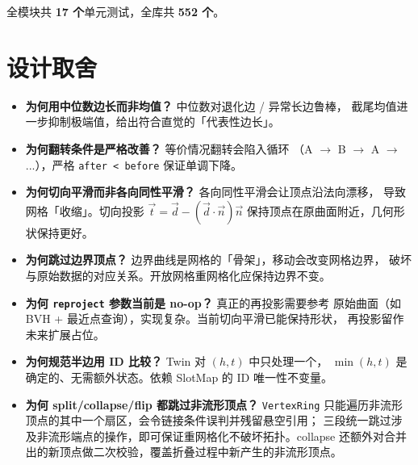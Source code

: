 \documentclass[11pt,a4paper]{article}
\begin{document}
全模块共 \textbf{17 个}单元测试，全库共 \textbf{552 个}。

\section{设计取舍}

\begin{itemize}
  \item \textbf{为何用中位数边长而非均值？} 中位数对退化边 / 异常长边鲁棒，
        截尾均值进一步抑制极端值，给出符合直觉的「代表性边长」。
  \item \textbf{为何翻转条件是严格改善？} 等价情况翻转会陷入循环
        （A $\to$ B $\to$ A $\to$ ...），严格 \texttt{after < before} 保证单调下降。
  \item \textbf{为何切向平滑而非各向同性平滑？} 各向同性平滑会让顶点沿法向漂移，
        导致网格「收缩」。切向投影 $\vec{t} = \vec{d} - (\vec{d} \cdot \vec{n})\vec{n}$
        保持顶点在原曲面附近，几何形状保持更好。
  \item \textbf{为何跳过边界顶点？} 边界曲线是网格的「骨架」，移动会改变网格边界，
        破坏与原始数据的对应关系。开放网格重网格化应保持边界不变。
  \item \textbf{为何 \texttt{reproject} 参数当前是 no-op？} 真正的再投影需要参考
        原始曲面（如 BVH + 最近点查询），实现复杂。当前切向平滑已能保持形状，
        再投影留作未来扩展占位。
  \item \textbf{为何规范半边用 ID 比较？} Twin 对 $(h, t)$ 中只处理一个，
        $\min(h, t)$ 是确定的、无需额外状态。依赖 SlotMap 的 ID 唯一性不变量。
  \item \textbf{为何 split/collapse/flip 都跳过非流形顶点？} \texttt{VertexRing}
        只能遍历非流形顶点的其中一个扇区，会令链接条件误判并残留悬空引用；
        三段统一跳过涉及非流形端点的操作，即可保证重网格化不破坏拓扑。collapse
        还额外对合并出的新顶点做二次校验，覆盖折叠过程中新产生的非流形顶点。
\end{itemize}
\end{document}
